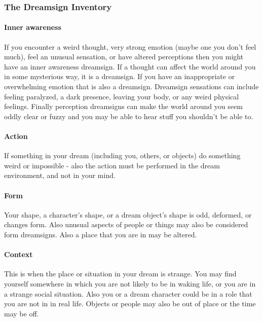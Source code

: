 \documentclass{article}
\begin{document}
\subsubsection{The Dreamsign Inventory \cite{leberge}}
\paragraph{Inner awareness} If you encounter a weird thought, very strong emotion (maybe one you don't feel much), feel an unusual sensation, or have altered perceptions then you might have an inner awareness dreamsign. If a thought can affect the world around you in some mysterious way, it is a dreamsign. If you have an inappropriate or overwhelming emotion that is also a dreamsign. Dreamsign sensations can include feeling paralyzed, a dark presence, leaving your body, or any weird physical feelings. Finally perception dreamsigns can make the world around you seem oddly clear or fuzzy and you may be able to hear stuff you shouldn't be able to.

\paragraph{Action} If something in your dream (including you, others, or objects) do something weird or impossible - also the action must be performed in the dream environment, and not in your mind.

\paragraph{Form} Your shape, a character's shape, or a dream object's shape is odd, deformed, or changes form. Also unusual aspects of people or things may also be considered form dreamsigns. Also a place that you are in may be altered.


\paragraph{Context} This is when the place or situation in your dream is strange. You may find yourself somewhere in which you are not likely to be in waking life, or you are in a strange social situation. Also you or a dream character could be in a role that you are not in in real life. Objects or people may also be out of place or the time may be off.
\end{document}
